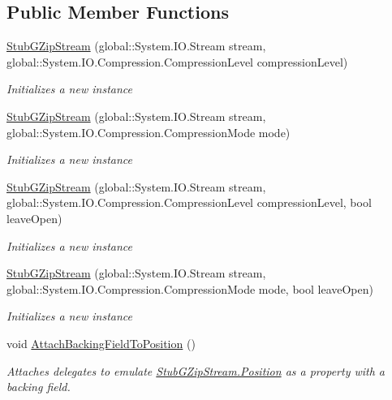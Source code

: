 \subsection*{Public Member Functions}
\begin{DoxyCompactItemize}
\item 
\hyperlink{class_system_1_1_i_o_1_1_compression_1_1_fakes_1_1_stub_g_zip_stream_a14ee9cf89dcebd95bf86937cd5012284}{Stub\-G\-Zip\-Stream} (global\-::\-System.\-I\-O.\-Stream stream, global\-::\-System.\-I\-O.\-Compression.\-Compression\-Level compression\-Level)
\begin{DoxyCompactList}\small\item\em Initializes a new instance\end{DoxyCompactList}\item 
\hyperlink{class_system_1_1_i_o_1_1_compression_1_1_fakes_1_1_stub_g_zip_stream_ad1a456c731f03df1f08c86fc42980fc7}{Stub\-G\-Zip\-Stream} (global\-::\-System.\-I\-O.\-Stream stream, global\-::\-System.\-I\-O.\-Compression.\-Compression\-Mode mode)
\begin{DoxyCompactList}\small\item\em Initializes a new instance\end{DoxyCompactList}\item 
\hyperlink{class_system_1_1_i_o_1_1_compression_1_1_fakes_1_1_stub_g_zip_stream_a40a67fb1686fe3360322cb4cab9fcaa9}{Stub\-G\-Zip\-Stream} (global\-::\-System.\-I\-O.\-Stream stream, global\-::\-System.\-I\-O.\-Compression.\-Compression\-Level compression\-Level, bool leave\-Open)
\begin{DoxyCompactList}\small\item\em Initializes a new instance\end{DoxyCompactList}\item 
\hyperlink{class_system_1_1_i_o_1_1_compression_1_1_fakes_1_1_stub_g_zip_stream_a275e5103c413f8c3f08873d75838da4b}{Stub\-G\-Zip\-Stream} (global\-::\-System.\-I\-O.\-Stream stream, global\-::\-System.\-I\-O.\-Compression.\-Compression\-Mode mode, bool leave\-Open)
\begin{DoxyCompactList}\small\item\em Initializes a new instance\end{DoxyCompactList}\item 
void \hyperlink{class_system_1_1_i_o_1_1_compression_1_1_fakes_1_1_stub_g_zip_stream_a4d1b2f7f15e1e5c137d0561abcddf9ec}{Attach\-Backing\-Field\-To\-Position} ()
\begin{DoxyCompactList}\small\item\em Attaches delegates to emulate \hyperlink{class_system_1_1_i_o_1_1_compression_1_1_fakes_1_1_stub_g_zip_stream_a70a4ee67aad1c5100c2d5eaae48b7fd7}{Stub\-G\-Zip\-Stream.\-Position} as a property with a backing field.\end{DoxyCompactList}\item 

\end{DoxyCompactItemize}

